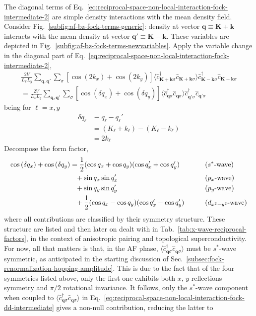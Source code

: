 The diagonal terms of Eq.~\eqref{eq:reciprocal-space-non-local-interaction-fock-intermediate-2} are simple density interactions with the mean density field. Consider Fig.~\ref{subfig:af-bz-fock-terms-generic}: density at vector $\mathbf{q}\equiv\mathbf{K}+\mathbf{k}$ interacts with the mean density at vector $\mathbf{q}'\equiv\mathbf{K}-\mathbf{k}$. These variables are depicted in Fig.~\ref{subfig:af-bz-fock-terms-newvariables}. Apply the variable change in the diagonal part of Eq.~\eqref{eq:reciprocal-space-non-local-interaction-fock-intermediate-2},
\begin{multline}
	\frac{2V}{L_x L_y} \sum_{\mathbf{q}, \mathbf{q}'} \sum_\sigma \left[
		\cos \left(
			2k_x
		\right)	+ \cos \left(
			2k_y
		\right)	
	\right] \langle
		\hat c_{\mathbf{K}+\mathbf{k} \sigma}^\dagger 
		\hat 	c_{\mathbf{K}+\mathbf{k} \sigma}
	\rangle
	\hat c_{\mathbf{K}-\mathbf{k} \sigma}^\dagger  \hat c_{\mathbf{K}-\mathbf{k}\sigma} \\
	= \frac{2V}{L_x L_y} \sum_{\mathbf{q}, \mathbf{q}'} \sum_\sigma \left[
		\cos \left( \delta q_x \right) + \cos \left( \delta q_y \right)	
	\right] \langle
		\hat c_{\mathbf{q}\sigma}^\dagger  \hat c_{\mathbf{q}\sigma}
	\rangle
	\hat c_{\mathbf{q}'\sigma}^\dagger  \hat c_{\mathbf{q}'\sigma}
	\label{eq:reciprocal-space-non-local-interaction-fock-dd-intermediate}
\end{multline}
being for $\ell=x,y$
\[
\begin{aligned}
	\delta q_\ell &\equiv q_\ell - q_\ell' \\
	&= (K_\ell+k_\ell) - (K_\ell-k_\ell) \\
	&= 2k_\ell
\end{aligned}
\]
Decompose the form factor,
\[
\begin{aligned}
	\cos \left( \delta q_x \right)	+ \cos \left( \delta q_y  \right) &= \frac{1}{2}  (\cos q_x + \cos q_y)(\cos q_x' + \cos q_y') &&\qquad\text{($s^*$-wave)} \\
	&\hphantom{=}+ \sin q_x \sin q_x' &&\qquad\text{($p_x$-wave)} \\
	&\hphantom{=}+ \sin q_y \sin q_y' &&\qquad\text{($p_y$-wave)} \\
	&\hphantom{=}+ \frac{1}{2} (\cos q_x - \cos q_y)(\cos q_x' - \cos q_y') &&\qquad\text{($d_{x^2-y^2}$-wave)}
\end{aligned}
\]
where all contributions are classified by their symmetry structure. These structure are listed and then later on dealt with in Tab.~\ref{tab:x-wave-reciprocal-factors}, in the context of anisotropic pairing and topological superconductivity. For now, all that matters is that, in the AF phase, $\langle \hat c_{\mathbf{q}\sigma}^\dagger  \hat c_{\mathbf{q}\sigma} \rangle$ must be $s^*$-wave symmetric, as anticipated in the starting discussion of Sec.~\ref{subsec:fock-renormalization-hopping-amplitude}. This is due to the fact that of the four symmetries listed above, only the first one exhibits both $x$, $y$ reflections symmetry and $\pi/2$ rotational invariance. It follows, only the $s^*$-wave component when coupled to $\langle \hat c_{\mathbf{q}\sigma}^\dagger  \hat c_{\mathbf{q}\sigma} \rangle$ in Eq.~\eqref{eq:reciprocal-space-non-local-interaction-fock-dd-intermediate} gives a non-null contribution, reducing the latter to
